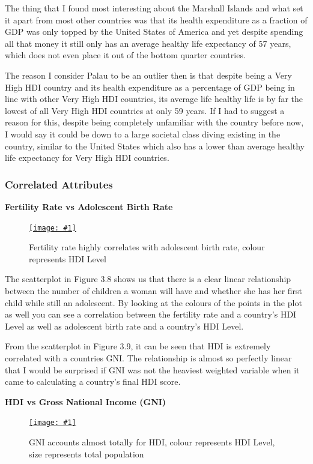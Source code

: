 \documentclass[11pt,a4paper,final]{article}
\newcommand\onlinefig[3]{
\begin{figure}[H]
  \centering
  \href{#3}{\texttt{[image: \#1]}}
  \caption{#2} 
  \label{fig:#1}
\end{figure}
}
\begin{document}
\begin{multicols}{2}
The thing that I found most interesting about the Marshall Islands and what set it apart from most other countries was that its health expenditure as a fraction of GDP was only topped by the United States of America and yet despite spending all that money it still only has an average healthy life expectancy of 57 years, which does not even place it out of the bottom quarter countries.

The reason I consider Palau to be an outlier then is that despite being a Very High HDI country and its health expenditure as a percentage of GDP being in line with other Very High HDI countries, its average life healthy life is by far the lowest of all Very High HDI countries at only 59 years. If I had to suggest a reason for this, despite being completely unfamiliar with the country before now, I would say it could be down to a large societal class diving existing in the country, similar to the United States which also has a lower than average healthy life expectancy for Very High HDI countries.
\vfill\null
\columnbreak

\subsubsection{Correlated Attributes}
\begin{flushleft}
\textbf{Fertility Rate vs Adolescent Birth Rate}
\end{flushleft}
\onlinefig{fertility_vs_adolescent_birth_rate_scatterplot}{Fertility rate highly correlates with adolescent birth rate, colour represents HDI Level}{https://public.tableau.com/views/CS3205-HDI/Sheet10?:language=en-GB&:display_count=n&:origin=viz_share_link}

The scatterplot in Figure 3.8 shows us that there is a clear linear relationship between the number of children a woman will have and whether she has her first child while still an adolescent. By looking at the colours of the points in the plot as well you can see a correlation between the fertility rate and a country's HDI Level as well as adolescent birth rate and a country's HDI Level.

From the scatterplot in Figure 3.9, it can be seen that HDI is extremely correlated with a countries GNI. The relationship is almost so perfectly linear that I would be surprised if GNI was not the heaviest weighted variable when it came to calculating a country's final HDI score.

\columnbreak
\begin{flushleft}
\textbf{HDI vs Gross National Income (GNI)}
\end{flushleft}
\onlinefig{gni_vs_hdi_scatterplot}{GNI accounts almost totally for HDI, colour represents HDI Level, size represents total population}{https://public.tableau.com/views/CS3205-HDI/Sheet5?:language=en-GB&:display_count=n&:origin=viz_share_link}


\end{multicols}
\end{document}
